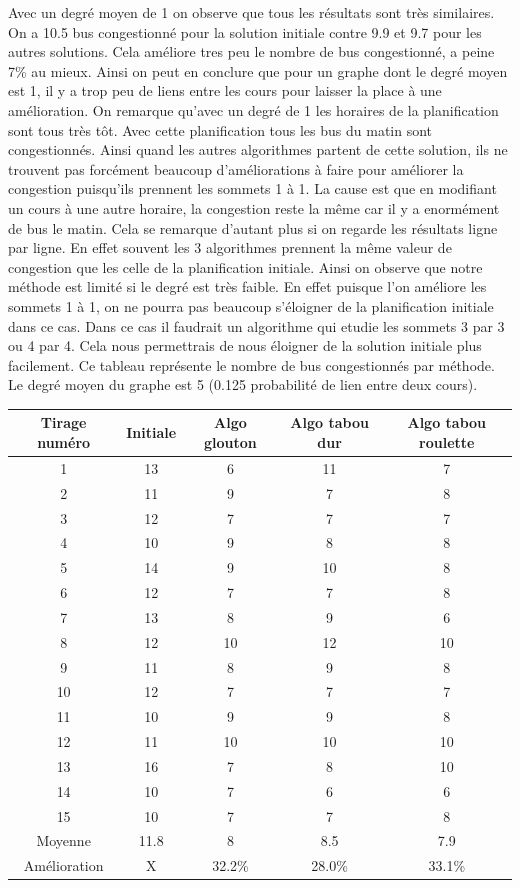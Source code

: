 \documentclass[a4paper,11pt]{article}
\begin{document}
	Avec un degré moyen de 1 on observe que tous les résultats sont très similaires. On a 10.5 bus congestionné pour la solution initiale contre 9.9 et 9.7 pour les autres solutions. Cela améliore tres peu le nombre de bus congestionné, a peine 7\% au mieux. Ainsi on peut en conclure que pour un graphe dont le degré moyen est 1, il y a trop peu de liens entre les cours pour laisser la place à une amélioration. On remarque qu'avec un degré de 1 les horaires de la planification sont tous très tôt. Avec cette planification tous les bus du matin sont congestionnés. Ainsi quand les autres algorithmes partent de cette solution, ils ne trouvent pas forcément beaucoup d'améliorations à faire pour améliorer la congestion puisqu'ils prennent les sommets 1 à 1. La cause est que en modifiant un cours à une autre horaire, la congestion reste la même car il y a enormément de bus le matin. Cela se remarque d'autant plus si on regarde les résultats ligne par ligne. En effet souvent les 3 algorithmes prennent la même valeur de congestion que les celle de la planification initiale. Ainsi on observe que notre méthode est limité si le degré est très faible. En effet puisque l'on améliore les sommets 1 à 1, on ne pourra pas beaucoup s'éloigner de la planification initiale dans ce cas. Dans ce cas il faudrait un algorithme qui etudie les sommets 3 par 3 ou 4 par 4. Cela nous permettrais de nous éloigner de la solution initiale plus facilement.
	\newpage
	Ce tableau représente le nombre de bus congestionnés par méthode. Le degré moyen du graphe est 5 (0.125 probabilité de lien entre deux cours).\\ 
	\begin{tabular}{|c|c|c|c|c|}
  		\hline
  		Tirage numéro & Initiale & Algo glouton & Algo tabou dur & Algo tabou roulette\\
  		\hline
  		1 & 13 & 6 & 11 & 7\\
  		\hline
  		2 & 11 & 9 & 7 & 8\\
  		\hline
  		3 & 12 & 7 & 7 & 7\\
  		\hline
  		4 & 10 & 9 & 8 & 8\\
  		\hline
  		5 & 14 & 9 & 10 & 8\\
  		\hline
  		6 & 12 & 7 & 7 & 8\\
  		\hline
  		7 & 13 & 8 & 9 & 6\\
  		\hline
  		8 & 12 & 10 & 12 & 10\\
  		\hline
  		9 & 11 & 8 & 9 & 8\\
  		\hline
  		10 & 12 & 7 & 7 & 7\\
  		\hline
  		11 & 10 & 9 & 9 & 8\\
  		\hline
  		12 & 11 & 10 & 10 & 10\\
  		\hline
  		13 & 16 & 7 & 8 & 10\\
  		\hline
  		14 & 10 & 7 & 6 & 6\\
  		\hline
  		15 & 10 & 7 & 7 & 8\\
  		\hline
  		Moyenne & 11.8 & 8 & 8.5 & 7.9\\
  		\hline
  		Amélioration & X & 32.2\% & 28.0\% & 33.1\%\\
  		\hline
	\end{tabular}
\end{document}
